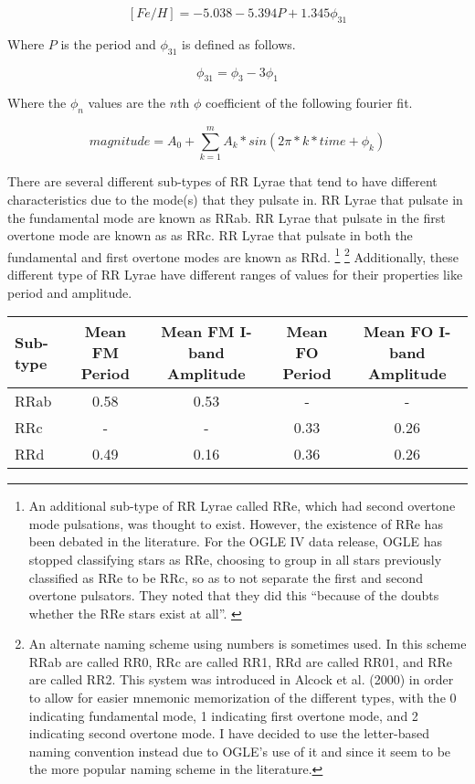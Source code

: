 \documentclass[]{article}
\begin{document}
$$
[Fe/H] = -5.038 - 5.394 P + 1.345 \phi_{31}
$$

Where $P$ is the period and $\phi_{31}$ is defined as follows. \cite{bhardwaj_2018}

$$
\phi_{31} = \phi_{3} - 3\phi_{1}
$$

Where the $\phi_{n}$ values are the $n$th $\phi$ coefficient of the following fourier fit.

$$
magnitude = A_{0} + \sum_{k=1}^{m} A_k * sin(2\pi * k * time + \phi_{k})
$$

There are several different sub-types of RR Lyrae that tend to have different characteristics due to the mode(s) that they pulsate in. \cite{chen_2013} RR Lyrae that pulsate in the fundamental mode are known as RRab. RR Lyrae that pulsate in the first overtone mode are known as as RRc. RR Lyrae that pulsate in both the fundamental and first overtone modes are known as RRd. \footnote{An additional sub-type of RR Lyrae called RRe, which had second overtone mode pulsations, was thought to exist. However, the existence of RRe has been debated in the literature. \cite{chen_2013} For the OGLE IV data release, OGLE has stopped classifying stars as RRe, choosing to group in all stars previously classified as RRe to be RRc, so as to not separate the first and second overtone pulsators. They noted that they did this ``because of the doubts whether the RRe stars exist at all''. \cite{soszynski_2016}} \footnote{An alternate naming scheme using numbers is sometimes used. In this scheme RRab are called RR0, RRc are called RR1, RRd are called RR01, and RRe are called RR2. This system was introduced in Alcock et al. (2000) in order to allow for easier mnemonic memorization of the different types, with the 0 indicating fundamental mode, 1 indicating first overtone mode, and 2 indicating second overtone mode. \cite{chen_2013} I have decided to use the letter-based naming convention instead due to OGLE’s use of it and since it seem to be the more popular naming scheme in the literature.} \cite{chen_2013} Additionally, these different type of RR Lyrae have different ranges of values for their properties like period and amplitude.


\begin{center}
\begin{tabular}{|l|c|c|c|c|}
	\hline
	Sub-type & Mean FM Period & Mean FM I-band Amplitude & Mean FO Period & Mean FO I-band Amplitude \\
	\hline
	RRab & 0.58 & 0.53 & - & - \\
	RRc & - & - & 0.33 & 0.26 \\
	RRd & 0.49 & 0.16 & 0.36 & 0.26 \\
	\hline
\end{tabular}
\end{center}
\end{document}
